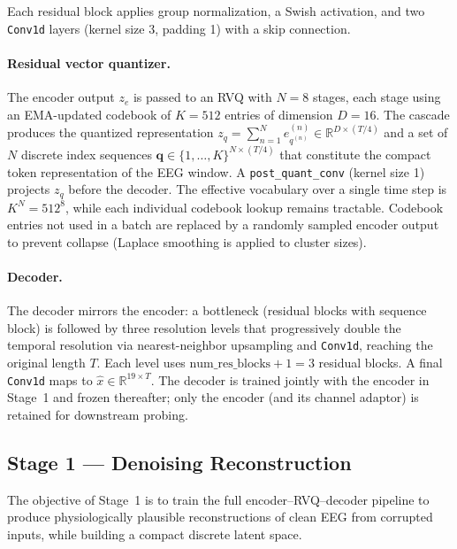 \documentclass{article}
\begin{document}
Each residual block applies group normalization, a Swish activation, and two \texttt{Conv1d} layers (kernel size 3, padding 1) with a skip connection.

\paragraph{Residual vector quantizer.}
The encoder output $z_e$ is passed to an RVQ with $N = 8$ stages, each stage using an EMA-updated codebook of $K = 512$ entries of dimension $D = 16$.
The cascade produces the quantized representation $z_q = \sum_{n=1}^{N} e^{(n)}_{q^{(n)}} \in \mathbb{R}^{D \times (T/4)}$ and a set of $N$ discrete index sequences $\mathbf{q} \in \{1, \ldots, K\}^{N \times (T/4)}$ that constitute the compact token representation of the EEG window.
A \texttt{post\_quant\_conv} (kernel size 1) projects $z_q$ before the decoder.
The effective vocabulary over a single time step is $K^N = 512^8$, while each individual codebook lookup remains tractable.
Codebook entries not used in a batch are replaced by a randomly sampled encoder output to prevent collapse (Laplace smoothing is applied to cluster sizes).

\paragraph{Decoder.}
The decoder mirrors the encoder: a bottleneck (residual blocks with sequence block) is followed by three resolution levels that progressively double the temporal resolution via nearest-neighbor upsampling and \texttt{Conv1d}, reaching the original length $T$.
Each level uses $\text{num\_res\_blocks} + 1 = 3$ residual blocks.
A final \texttt{Conv1d} maps to $\hat{x} \in \mathbb{R}^{19 \times T}$.
The decoder is trained jointly with the encoder in Stage~1 and frozen thereafter; only the encoder (and its channel adaptor) is retained for downstream probing.


\subsection{Stage 1 — Denoising Reconstruction}

The objective of Stage~1 is to train the full encoder--RVQ--decoder pipeline to produce physiologically plausible reconstructions of clean EEG from corrupted inputs, while building a compact discrete latent space.
\end{document}
